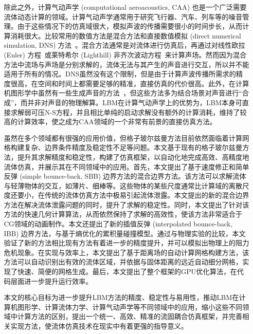除此之外，计算气动声学 (computational aeroacoustics, CAA) 也是一个广泛需要流体动态计算的领域。计算气动声学通常用于研究飞行器、汽车、列车等的噪音管理。由于这些情况下的仿真域很大，模拟声波的传播需要很小的时间步长，从而计算消耗很大。比较常用的数值方法是混合方法和直接数值模拟 (direct numerical simulation, DNS) 方法~\cite{doi:10.2514/1.15993}。混合方法通常是对流体进行仿真后，再通过对线性欧拉 (Euler) 方程~\cite{doi:10.1080/10618560410001673498,Bogey:2002:1610-1928:463,doi:10.2514/1.18933}或莱特希尔 (Lighthill) 非齐次波动方程~\cite{doi:10.1098/rspa.1952.0060}来计算声场。然而因为混合方法中流场与声场是分别求解的，流体无法与其产生的声音进行交互，所以并不能适用于所有的情况。DNS虽然没有这个限制，但是由于计算声波传播所需求的精度很高，在空间和时间上都需要足够的精准，直接仿真的代价很高。此外，在计算机图形学中虽然有一些生成声音的方法~\cite{10.1145/2897826.2927375}，但这些方法多为结合场景对声音进行“合成”，而并非对声音的物理解算。LBM在计算气动声学上的优势为，LBM本身可直接求解弱可压N-S方程，并且相比单纯的启动求解没有额外的计算消耗，维持了较高的计算效率，使之成为CAA领域的一个非常有前景的直接仿真方法。

虽然在多个领域都有很强的应用价值，但格子玻尔兹曼方法目前依然面临着计算网格构建复杂、边界条件精度及稳定性不足等问题。本文基于现有的格子玻尔兹曼方法，提升其求解精度和稳定性，构建了仿真框架，以自动化地完成高效、高精度地流体仿真，并展示其在不同领域中的应用。首先，本文提出了基于速度修正和简单反弹 (simple bounce-back, SBB) 边界方法的混合边界方法。该方法可以求解流体与轻薄物体的交互，如薄片、细棒等。这些物体的某些尺度通常比计算域的离散尺度还要小，在传统的流体仿真方法中极易引起流体泄露。本文提出的新的混合边界方法在解决流体泄露问题的同时，提升了求解的稳定性。同时，本文提出了针对该方法的快速几何计算算法，从而依然保持了求解的高效性，使该方法非常适合于CG领域的动画制作。本文还提出了新的插值反弹 (interpolated bounce-back, IBB) 边界方法，与基于熵优化的累积量碰撞模型。通过与物理实验的比较，本文验证了新的方法相比现有方法有着进一步的精度提升，并可以模拟出物理上的阻力危机现象。在实现与效率上，本文提出了基于距离场的自动计算网格构建方法，该方法可以自动识别出有效的流体区域，并依据与固体距离的远近自动细分网格，实现了快速、简便的网格生成。最后，本文提出了整个框架的GPU优化算法，在代码层面进一步提升运行效率。

本文的核心目标为进一步提升LBM方法的精度、稳定性与易用性，推动LBM在计算机图形学、计算流体力学、计算气动声学等不同领域中的应用，缩小这些不同领域中计算方法的区别，提出一个统一、高效、精准的流固耦合仿真框架，并完善相关实现方法，使流体仿真技术在现实中有着更强的指导意义。


